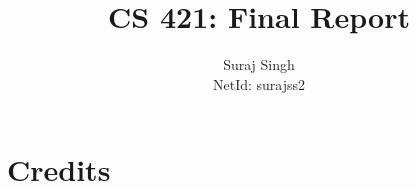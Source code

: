 \documentclass[letterpaper, 11pt]{article}
\title{CS 421: Final Report}
\author{Suraj Singh \\ NetId: surajss2 }
\begin{document}
\maketitle

\section{Credits}\label{sec:credits}
\end{document}
